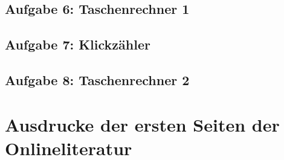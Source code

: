 \begin{appendices}



\subsection{Aufgabe 6: Taschenrechner 1}
\label{app:code6}




\subsection{Aufgabe 7: Klickzähler}
\label{app:code7}




\subsection{Aufgabe 8: Taschenrechner 2}
\label{app:code8}




\section{Ausdrucke der ersten Seiten der Onlineliteratur}
\pagebreak


\pagebreak


\pagebreak




\end{appendices}